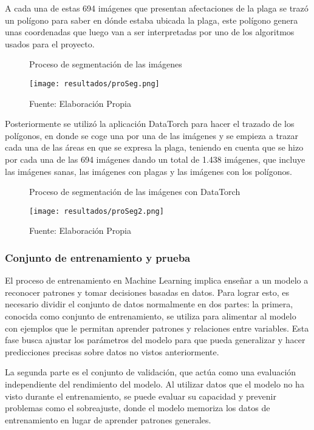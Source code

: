 A cada una de estas 694 imágenes que presentan afectaciones de la plaga se trazó un polígono para saber en dónde estaba ubicada la plaga, este polígono genera unas coordenadas que luego van a ser interpretadas por uno de los algoritmos usados para el proyecto.

\newpage

\begin{figure}[h]
\centering
\caption{Proceso de segmentación de las imágenes}
\texttt{[image: resultados/proSeg.png]}
\caption*{\footnotesize Fuente: Elaboración Propia}
\label{fig:figuraProSeg}
\end{figure}

Posteriormente se utilizó la aplicación DataTorch para hacer el trazado de los polígonos, en donde se coge una por una de las imágenes y se empieza a trazar cada una de las áreas en que se expresa la plaga, teniendo en cuenta que se hizo por cada una de las 694 imágenes dando un total de 1.438 imágenes, que incluye las imágenes sanas, las imágenes con plagas y las imágenes con los polígonos.

\begin{figure}[h]
\centering
\caption{Proceso de segmentación de las imágenes con DataTorch}
\texttt{[image: resultados/proSeg2.png]}
\caption*{\footnotesize Fuente: Elaboración Propia}
\label{fig:figuraProSegDatatorch}
\end{figure}

\subsubsection{Conjunto de entrenamiento y prueba}

El proceso de entrenamiento en Machine Learning implica enseñar a un modelo a reconocer patrones y tomar decisiones basadas en datos. Para lograr esto, es necesario dividir el conjunto de datos normalmente en dos partes: la primera, conocida como conjunto de entrenamiento, se utiliza para alimentar al modelo con ejemplos que le permitan aprender patrones y relaciones entre variables. Esta fase busca ajustar los parámetros del modelo para que pueda generalizar y hacer predicciones precisas sobre datos no vistos anteriormente.

\newpage

La segunda parte es el conjunto de validación, que actúa como una evaluación independiente del rendimiento del modelo. Al utilizar datos que el modelo no ha visto durante el entrenamiento, se puede evaluar su capacidad y prevenir problemas como el sobreajuste, donde el modelo memoriza los datos de entrenamiento en lugar de aprender patrones generales.

